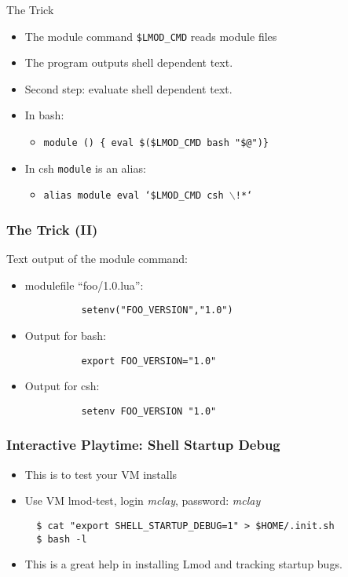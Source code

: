 \documentclass{beamer}
\begin{document}
\begin{frame}{The Trick}
  \begin{itemize}
    \item The module command {\color{blue}\texttt{\$LMOD\_CMD}} reads module files
    \item The program outputs shell dependent text.
    \item Second step: evaluate shell dependent text.
    \item In bash:
      \begin{itemize}
          \item {\color{blue}\texttt{module () \{ eval \$(\$LMOD\_CMD bash "\$@")\}}}
      \end{itemize}
    \item In csh \texttt{module} is an alias:
      \begin{itemize}
        \item {\color{blue}\texttt{alias module eval `\$LMOD\_CMD csh $\backslash$!*`}}
      \end{itemize}
  \end{itemize}
\end{frame}

\begin{frame}[fragile]
    \frametitle{The Trick (II)}
    Text output of the module command:
    \begin{itemize}
      \item modulefile ``foo/1.0.lua'':
    {
\begin{verbatim}
          setenv("FOO_VERSION","1.0")
\end{verbatim}
    }
     \item Output for bash:
\begin{verbatim}
          export FOO_VERSION="1.0"
\end{verbatim}
     \item Output for csh:
\begin{verbatim}
          setenv FOO_VERSION "1.0"
\end{verbatim}
    \end{itemize}
\end{frame}

\begin{frame}[fragile]
    \frametitle{Interactive Playtime: Shell Startup Debug}
  \begin{itemize}
    \item This is to test your VM installs
    \item Use VM lmod-test, login \emph{mclay}, password: \emph{mclay}
    {\small
\begin{verbatim}
  $ cat "export SHELL_STARTUP_DEBUG=1" > $HOME/.init.sh
  $ bash -l
\end{verbatim}
}
    \item This is a great help in installing Lmod and tracking startup bugs.
  \end{itemize}
\end{frame}
\end{document}
